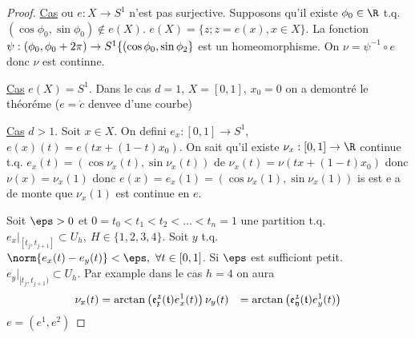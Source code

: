 \begin{proof}
	\underline{Cas} ou $e: X\rightarrow S^1$ n'est pas surjective. Supposons qu'il existe $\phi_0\in \R$ t.q. $(\cos\phi_0, \sin\phi_0)\notin e(X)$. $e(X)=\{z; z=e(x), x\in X\}$.
	La fonction $\psi:(\phi_0, \phi_0+2\pi)\rightarrow S^1\\\{(\cos\phi_0, \sin\phi_2\}$ est un homeomorphisme.
	On $\nu=\psi^{-1}\circ e$ donc $\nu$ est continne.
	
	\underline{Cas} $e(X)=S^1$. Dans le cas $d=1$, $X=[0,1]$, $x_0=0$ on a demontré le théoréme ($e=\dot{c}$ denvee d'une courbe) %
	
	\underline{Cas} $d>1$. Soit $x\in X$. On defini $e_x:[0,1]\rightarrow S^1$, $e(x)(t)=e(tx+(1-t)x_0)$. %
	On sait qu'il existe $\nu_x:[0,1]\rightarrow \R$ continue t.q. $e_x(t)=(\cos\nu_x(t),\sin\nu_x(t))$ de $\nu_x(t)=\nu(tx+(1-t)x_0)$ donc $\nu(x)=\nu_x(1)$ donc
	$e(x)=e_x(1)=(\cos\nu_x(1), \sin\nu_x(1))$ is est e a de monte que $\nu_x(1)$ est continue en $e$.
	
	Soit $\eps>0$ et $0=t_0<t_1<t_2<...<t_n=1$ une partition t.q. $e_x|_{[t_j, t_{j+1}]}\subset U_h,\ H\in\{1,2,3,4\}$. Soit $y$ t.q. $\norm{e_x(t)-e_y(t)}<\eps,\ \forall t\in [0,1]$. Si $\eps$ est sufficiont petit. $e_y|_{[t_j, t_{j+1})}\subset U_h$. Par example dans le cas $h=4$ on aura
	\begin{align}
		\nu_x(t) &=\arctan\left(\frak{e_x^2(t)}{e_x^1(t)}\right)
		\nu_y(t) &=\arctan\left(\frak{e_y^2(t)}{e_y^1(t)}\right)		
	\end{align}
	$e=(e^1, e^2)$
\end{proof}

